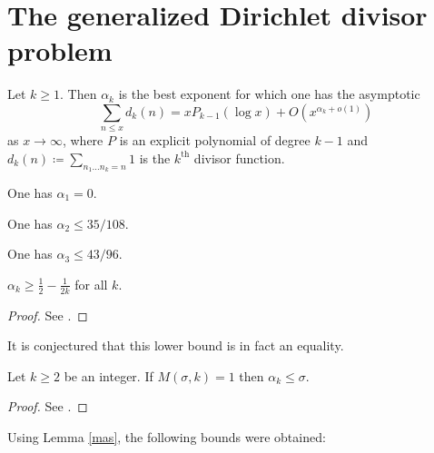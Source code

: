 \chapter{The generalized Dirichlet divisor problem}

\begin{definition}\label{divisor-def} Let $k \geq 1$. Then $\alpha_k$ is the best exponent for which one has the asymptotic
$$ \sum_{n \leq x} d_k(n) = x P_{k-1}(\log x) + O(x^{\alpha_k+o(1)})$$
as $x \to \infty$, where $P$ is an explicit polynomial of degree $k-1$ and $d_k(n) \coloneqq \sum_{n_1 \dots n_k=n} 1$ is the $k^{\mathrm{th}}$ divisor function.
\end{definition}

\begin{lemma}[$d_1$ exponent] One has $\alpha_1=0$.
\end{lemma}

\begin{lemma}\cite[Theorem 13.1]{ivic} One has $\alpha_2 \leq 35/108$.
\end{lemma}

\begin{lemma}\cite{kolesnik} One has $\alpha_3 \leq 43/96$.
\end{lemma}


\begin{lemma} $\alpha_k \geq \frac{1}{2} - \frac{1}{2k}$ for all $k$.
\end{lemma}

\begin{proof} See \cite{hardy_divisor_1916, szego-walfisz-I, szego-walfisz-II}.
\end{proof}

It is conjectured that this lower bound is in fact an equality.

\begin{lemma}\label{mas}  Let $k \geq 2$ be an integer. If $M(\sigma,k) = 1$ then $\alpha_k \leq \sigma$.
\end{lemma}

\begin{proof}  See \cite[\S 13.3]{ivic}.
\end{proof}

Using Lemma \ref{mas}, the following bounds were obtained:

